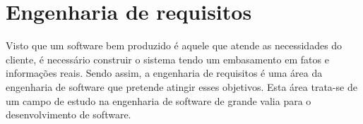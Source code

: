      
\section{Engenharia de requisitos}

Visto que um software bem produzido é aquele que atende as necessidades do cliente, é necessário construir o sistema tendo um embasamento em fatos e informações reais. Sendo assim, a engenharia de requisitos é uma área da engenharia de software que pretende atingir esses objetivos. Esta área trata-se de um campo de estudo na engenharia de software de grande valia para o desenvolvimento de software.

